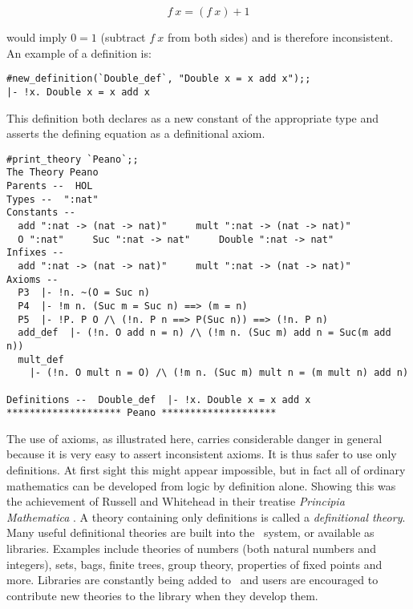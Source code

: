 \[ f\ x = (f\ x)+1 \]

\noindent would imply $0=1$ (subtract $f\ x$ from both sides)
and is therefore inconsistent. An example of a definition is:

\begin{session}\begin{verbatim}
#new_definition(`Double_def`, "Double x = x add x");;
|- !x. Double x = x add x
\end{verbatim}\end{session}

\noindent This definition both declares  as a new constant of the
appropriate type and asserts the defining equation as a definitional axiom.

\begin{session}\begin{verbatim}
#print_theory `Peano`;;
The Theory Peano
Parents --  HOL
Types --  ":nat"
Constants --
  add ":nat -> (nat -> nat)"     mult ":nat -> (nat -> nat)"
  O ":nat"     Suc ":nat -> nat"     Double ":nat -> nat"
Infixes --
  add ":nat -> (nat -> nat)"     mult ":nat -> (nat -> nat)"
Axioms --
  P3  |- !n. ~(O = Suc n)
  P4  |- !m n. (Suc m = Suc n) ==> (m = n)
  P5  |- !P. P O /\ (!n. P n ==> P(Suc n)) ==> (!n. P n)
  add_def  |- (!n. O add n = n) /\ (!m n. (Suc m) add n = Suc(m add n))
  mult_def
    |- (!n. O mult n = O) /\ (!m n. (Suc m) mult n = (m mult n) add n)

Definitions --  Double_def  |- !x. Double x = x add x
******************** Peano ********************
\end{verbatim}\end{session}


The use of axioms, as illustrated here, carries considerable  danger in general
because it is very easy to assert inconsistent axioms.  It is thus safer to use
only definitions.  At first sight this might appear impossible, but in fact all
of ordinary  mathematics  can  be  developed  from  logic  by definition alone.
Showing this was  the achievement  of Russell  and Whitehead  in their treatise
{\sl Principia  Mathematica}  \cite{Principia}.    A   theory  containing  only
definitions is called a {\it definitional theory\/}.   Many useful definitional
theories are built into the \HOL\ system, or available as libraries.  Examples
include theories of numbers  (both natural  numbers and  integers), sets, bags,
finite trees, group theory, properties of fixed points and more.  Libraries are
constantly being  added  to \HOL\  and users  are encouraged  to contribute new
theories to the library when they develop them.

